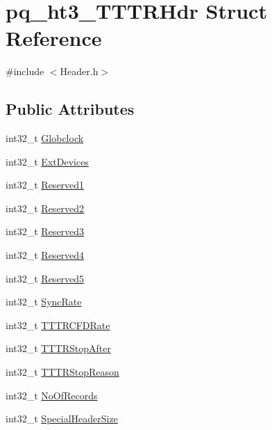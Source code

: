 \hypertarget{structpq__ht3___t_t_t_r_hdr}{}\section{pq\+\_\+ht3\+\_\+\+T\+T\+T\+R\+Hdr Struct Reference}
\label{structpq__ht3___t_t_t_r_hdr}


{\ttfamily \#include $<$Header.\+h$>$}

\subsection*{Public Attributes}
\begin{DoxyCompactItemize}
\item 
int32\+\_\+t \hyperlink{structpq__ht3___t_t_t_r_hdr_a572a2e6ff812b98f83cfd529be109930}{Globclock}
\item 
int32\+\_\+t \hyperlink{structpq__ht3___t_t_t_r_hdr_a41c90a4c31086a040ac75b3d68f59464}{Ext\+Devices}
\item 
int32\+\_\+t \hyperlink{structpq__ht3___t_t_t_r_hdr_a44cf44e4b5d905308535b5693b3ad210}{Reserved1}
\item 
int32\+\_\+t \hyperlink{structpq__ht3___t_t_t_r_hdr_a58672117a6913f506c24ae2862aeb1eb}{Reserved2}
\item 
int32\+\_\+t \hyperlink{structpq__ht3___t_t_t_r_hdr_a3b5cd48d2f04650538044eb53297fed9}{Reserved3}
\item 
int32\+\_\+t \hyperlink{structpq__ht3___t_t_t_r_hdr_a4234d1405e359316d023988416b47e3d}{Reserved4}
\item 
int32\+\_\+t \hyperlink{structpq__ht3___t_t_t_r_hdr_ad4fab4d4a81d08ee63ba336125e8aaa6}{Reserved5}
\item 
int32\+\_\+t \hyperlink{structpq__ht3___t_t_t_r_hdr_a8e1ec625623e995cbe02ef9b0c49c349}{Sync\+Rate}
\item 
int32\+\_\+t \hyperlink{structpq__ht3___t_t_t_r_hdr_a3ae0c53b4968b1768b4ec184dafa7110}{T\+T\+T\+R\+C\+F\+D\+Rate}
\item 
int32\+\_\+t \hyperlink{structpq__ht3___t_t_t_r_hdr_a31ece9b68f95d0a0a5872e1c33021d64}{T\+T\+T\+R\+Stop\+After}
\item 
int32\+\_\+t \hyperlink{structpq__ht3___t_t_t_r_hdr_aba0a61eca829c63423184073408635b0}{T\+T\+T\+R\+Stop\+Reason}
\item 
int32\+\_\+t \hyperlink{structpq__ht3___t_t_t_r_hdr_a9c7bca4d38ad5ba0384fe13f6ebc534d}{No\+Of\+Records}
\item 
int32\+\_\+t \hyperlink{structpq__ht3___t_t_t_r_hdr_a0d0f4d32b72717c8ae30a2d26967f90e}{Special\+Header\+Size}
\end{DoxyCompactItemize}


